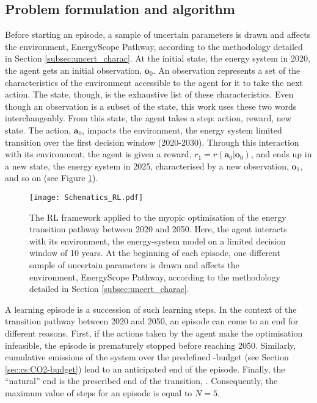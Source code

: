 \subsection{Problem formulation and algorithm}
\label{subsec:meth_RL_algo}
Before starting an episode, a sample of uncertain parameters is drawn and affects the environment, EnergyScope Pathway, according to the methodology detailed in Section \ref{subsec:uncert_charac}. At the initial state, \ie the energy system in 2020, the agent gets an initial observation, $\bm{o}_0$. An observation represents a set of the characteristics of the environment accessible to the agent for it to take the next action. The state, though, is the exhaustive list of these characteristics. Even though an observation is a subset of the state, this work uses these two words interchangeably. From this state, the agent takes a step: action, reward, new state. The action, $\bm{a}_0$, impacts the environment, \ie the energy system limited transition over the first decision window (2020-2030). Through this interaction with its environment, the agent is given a reward, $r_1=r\left(\bm{a}_0 | \bm{o}_0 \right)$, and ends up in a new state, \ie the energy system in 2025, characterised by a new observation, $\bm{o}_1$, and so on (see Figure \ref{fig:Schematics_RL}).


\begin{figure}[!htbp]
\centering
\texttt{[image: Schematics\_RL.pdf]}
\caption{The \Acrfull{RL} framework applied to the myopic optimisation of the energy transition pathway between 2020 and 2050. Here, the agent interacts with its environment, \ie the energy-system model on a limited decision window of 10 years. At the beginning of each episode, one different sample of uncertain parameters is drawn and affects the environment, EnergyScope Pathway, according to the methodology detailed in Section \ref{subsec:uncert_charac}.}
\label{fig:Schematics_RL}
\end{figure}

A learning episode is a succession of such learning steps. In the context of the transition pathway between 2020 and 2050, an episode can come to an end for different reasons. First, if the actions taken by the agent make the optimisation infeasible, the episode is prematurely stopped before reaching 2050. Similarly, cumulative emissions of the system over the predefined -budget (see Section \ref{sec:cs:CO2-budget}) lead to an anticipated end of the episode. Finally, the ``natural'' end is the prescribed end of the transition, . Consequently, the maximum value of steps for an episode is equal to $N=5$. 

